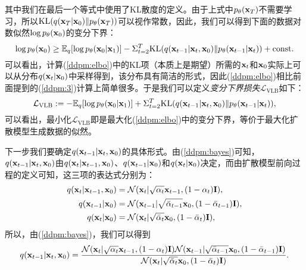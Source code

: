 \documentclass[11pt,a4paper,UTF8]{ctexart}
\begin{document}
其中我们在最后一个等式中使用了KL散度的定义。由于上式中$p_{\theta}(\mathbf{x}_T)$不需要学习，所以$\text{KL}(q(\mathbf{x}_T|\mathbf{x}_0)\| p_{\theta}(\mathbf{x}_T))$可以视作常数，因此，我们可以得到下面的数据对数似然$\log p_{\theta}(\mathbf{x}_0)$的变分下界：
\begin{equation}
\log p_{\theta}(\mathbf{x}_0) \geq \mathbb{E}_q [\log p_{\theta}(\mathbf{x}_0|\mathbf{x}_1)] -  \Sigma_{t=2}^T \text{KL}(q(\mathbf{x}_{t-1}|\mathbf{x}_t,\mathbf{x}_0) \| p_{\theta}(\mathbf{x}_{t-1}|\mathbf{x}_t)) + \text{const}.
\label{ddpm:elbo}
\end{equation}
可以看出，计算(\ref{ddpm:elbo})中的KL项（本质上是期望）所需的$\mathbf{x}_t$和$\mathbf{x}_0$实际上可以从分布$q(\mathbf{x}_t|\mathbf{x}_0)$中采样得到，该分布具有简洁的形式，因此(\ref{ddpm:elbo})相比前面提到的(\ref{ddpm:3})计算上简单很多。于是我们可以定义\emph{变分下界损失}$\mathcal{L}_{\text{VLB}}$如下：
\begin{equation}
\mathcal{L}_{\text{VLB}} := -\mathbb{E}_q [\log p_{\theta}(\mathbf{x}_0|\mathbf{x}_1)] +  \Sigma_{t=2}^T \text{KL}(q(\mathbf{x}_{t-1}|\mathbf{x}_t,\mathbf{x}_0) \| p_{\theta}(\mathbf{x}_{t-1}|\mathbf{x}_t)),
\label{ddpm:loss_vlb}
\end{equation}
可以看出，最小化$\mathcal{L}_{\text{VLB}}$即是最大化(\ref{ddpm:elbo})中的变分下界，等价于最大化扩散模型生成数据的似然。


下一步我们要确定$q(\mathbf{x}_{t-1}|\mathbf{x}_t,\mathbf{x}_0)$的具体形式。由(\ref{ddpm:bayes})可知，$q(\mathbf{x}_{t-1}|\mathbf{x}_t,\mathbf{x}_0)$由$q(\mathbf{x}_{t}|\mathbf{x}_{t-1},\mathbf{x}_0)$、$q(\mathbf{x}_{t-1}|\mathbf{x}_0)$和$q(\mathbf{x}_{t}|\mathbf{x}_0)$决定，而由扩散模型前向过程的定义可知，这三项的表达式分别为：
\begin{align*}
    q(\mathbf{x}_{t}|\mathbf{x}_{t-1},\mathbf{x}_0) &= \mathcal{N}(\mathbf{x}_t|\sqrt{\alpha_t}\mathbf{x}_{t-1},(1-\alpha_t)\mathbf{I}),  \\
    q(\mathbf{x}_{t-1}|\mathbf{x}_0) &= \mathcal{N}(\mathbf{x}_{t-1}|\sqrt{\bar{\alpha}_{t-1}}\mathbf{x}_0,(1-\bar{\alpha}_{t-1})\mathbf{I}), \\
    q(\mathbf{x}_{t}|\mathbf{x}_0) &=\mathcal{N}(\mathbf{x}_{t}|\sqrt{\bar{\alpha}_{t}}\mathbf{x}_0,(1-\bar{\alpha}_{t})\mathbf{I}),
\end{align*}
所以，由(\ref{ddpm:bayes})，我们可以得到
\begin{equation*}
    q(\mathbf{x}_{t-1}|\mathbf{x}_t,\mathbf{x}_0) = \frac{\mathcal{N}(\mathbf{x}_t|\sqrt{\alpha_t}\mathbf{x}_{t-1},(1-\alpha_t)\mathbf{I})\mathcal{N}(\mathbf{x}_{t-1}|\sqrt{\bar{\alpha}_{t-1}}\mathbf{x}_0,(1-\bar{\alpha}_{t-1})\mathbf{I})}{\mathcal{N}(\mathbf{x}_{t}|\sqrt{\bar{\alpha}_{t}}\mathbf{x}_0,(1-\bar{\alpha}_{t})\mathbf{I})}.
\label{ddpm:dist_of_reverse_pre}
\end{equation*}
\end{document}
